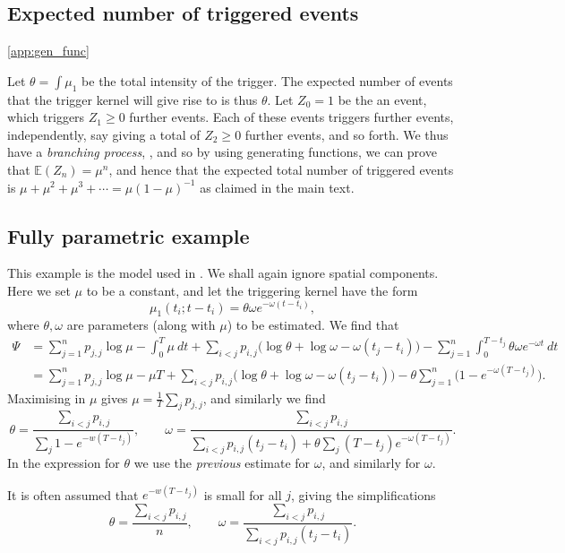 \documentclass[twoside,a4paper]{article}
\theoremstyle{plain}
\theoremstyle{definition}
\begin{document}
\subsection{Expected number of triggered events}\ref{app:gen_func}

Let $\theta = \int \mu_1$ be the total intensity of the trigger.  The expected number of
events that the trigger kernel will give rise to is thus $\theta$.
Let $Z_0=1$ be the an event, which triggers $Z_1 \geq 0$ further events.  Each of
these events triggers further events, independently, say giving a total of $Z_2\geq 0$
further events, and so forth.  We thus have a \emph{branching process}, \cite[Section~5.4]{gs},
and so by using generating functions, we can prove that $\mathbb E(Z_n) = \mu^n$, and hence
that the expected total number of triggered events is $\mu + \mu^2 + \mu^3 + \cdots
= \mu(1-\mu)^{-1}$ as claimed in the main text.



\subsection{Fully parametric example}\label{app:hawkes_em}

This example is the model used in \cite[Section~2]{lm}.
We shall again ignore spatial components.
Here we set $\mu$ to be a constant, and let the triggering kernel have the form
\[ \mu_1(t_i; t - t_i) = \theta \omega e^{-\omega(t-t_i)}, \]
where $\theta, \omega$ are parameters (along with $\mu$) to be estimated.
We find that
\begin{align*} \Psi &= \sum_{j=1}^n p_{j,j} \log\mu - \int_0^T \mu \ dt
+ \sum_{i<j} p_{i,j} \big( \log\theta + \log\omega - \omega(t_j-t_i) \big)
- \sum_{j=1}^n \int_0^{T-t_j} \theta \omega e^{-\omega t} \ dt \\
&= \sum_{j=1}^n p_{j,j} \log\mu - \mu T
+ \sum_{i<j} p_{i,j} \big( \log\theta + \log\omega - \omega(t_j-t_i) \big)
- \theta \sum_{j=1}^n \big(1 - e^{-\omega (T-t_j)}\big).
\end{align*}
Maximising in $\mu$ gives $\mu = \frac{1}{T} \sum_j p_{j,j}$, and similarly we find
\[ \theta = \frac{\sum_{i<j} p_{i,j}}{\sum_j 1 - e^{-w(T-t_j)}}, \qquad
\omega = \frac{\sum_{i<j} p_{i,j}}{\sum_{i<j} p_{i,j} (t_j-t_i) + \theta\sum_j (T-t_j)e^{-\omega(T-t_j)}}. \]
In the expression for $\theta$ we use the \emph{previous} estimate for $\omega$, and similarly
for $\omega$.

It is often assumed that $e^{-w(T-t_j)}$ is small for all $j$, giving the simplifications
\[ \theta = \frac{\sum_{i<j} p_{i,j}}{n}, \qquad
\omega = \frac{\sum_{i<j} p_{i,j}}{\sum_{i<j} p_{i,j} (t_j-t_i)}. \]
\end{document}
